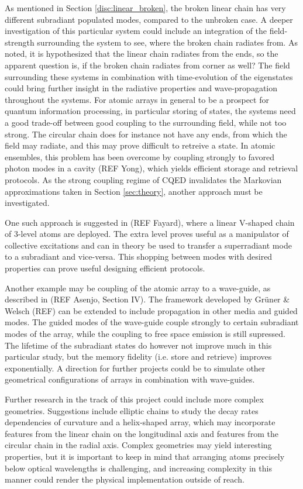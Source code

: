 \documentclass{article}
\begin{document}
As mentioned in Section \ref{disc:linear_broken}, the broken linear chain has very different subradiant populated modes, compared to the unbroken case. A deeper investigation of this particular system could include an integration of the field-strength surrounding the system to see, where the broken chain radiates from. As noted, it is hypothesized that the linear chain radiates from the ends, so the apparent question is, if the broken chain radiates from corner as well? The field surrounding these systems in combination with time-evolution of the eigenstates could bring further insight in the radiative properties and wave-propagation throughout the systems. For atomic arrays in general to be a prospect for quantum information processing, in particular storing of states, the systems need a good trade-off between good coupling to the surrounding field, while not too strong. The circular chain does for instance not have any ends, from which the field may radiate, and this may prove difficult to retreive a state. In atomic ensembles, this problem has been overcome by coupling strongly to favored photon modes in a cavity (REF Yong), which yields efficient storage and retrieval protocols. As the strong coupling regime of CQED invalidates the Markovian approximations taken in Section \ref{sec:theory}, another approach must be investigated. 

One such approach is suggested in (REF Fayard), where a linear V-shaped chain of 3-level atoms are deployed. The extra level proves useful as a manipulator of collective excitations and can in theory be used to transfer a superradiant mode to a subradiant and vice-versa. This shopping between modes with desired properties can prove useful designing efficient protocols. 

Another example may be coupling of the atomic array to a wave-guide, as described in (REF Asenjo, Section IV). The framework developed by Grüner \& Welsch (REF) can be extended to include propagation in other media and guided modes. The guided modes of the wave-guide couple strongly to certain subradiant modes of the array, while the coupling to free space emission is still supressed. The lifetime of the subradiant states do however not improve much in this particular study, but the memory fidelity (i.e. store and retrieve) improves exponentially. A direction for further projects could be to simulate other geometrical configurations of arrays in combination with wave-guides. 

Further research in the track of this project could include more complex geometries. Suggestions include elliptic chains to study the decay rates dependencies of curvature and a helix-shaped array, which may incorporate features from the linear chain on the longitudinal axis and features from the circular chain in the radial axis. Complex geometries may yield interesting properties, but it is important to keep in mind that arranging atoms precisely below optical wavelengths is challenging, and increasing complexity in this manner could render the physical implementation outside of reach. 
\end{document}
